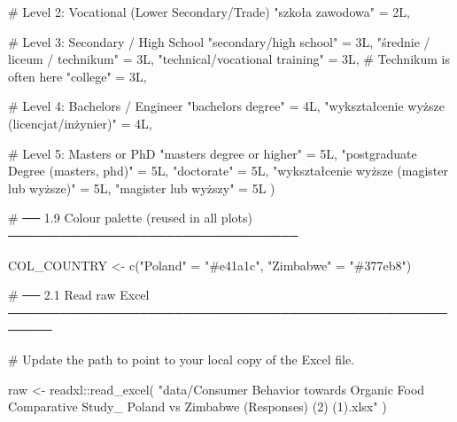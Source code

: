 \documentclass[
  letterpaper,
  DIV=11,
  numbers=noendperiod]{scrartcl}
\newenvironment{Shaded}{\begin{snugshade}}{\end{snugshade}}
\newcommand{\CommentTok}[1]{\textcolor[rgb]{0.37,0.37,0.37}{#1}}
\newcommand{\DecValTok}[1]{\textcolor[rgb]{0.68,0.00,0.00}{#1}}
\newcommand{\FunctionTok}[1]{\textcolor[rgb]{0.28,0.35,0.67}{#1}}
\newcommand{\NormalTok}[1]{\textcolor[rgb]{0.00,0.23,0.31}{#1}}
\newcommand{\OtherTok}[1]{\textcolor[rgb]{0.00,0.23,0.31}{#1}}
\newcommand{\SpecialCharTok}[1]{\textcolor[rgb]{0.37,0.37,0.37}{#1}}
\newcommand{\StringTok}[1]{\textcolor[rgb]{0.13,0.47,0.30}{#1}}
\begin{document}
\begin{Shaded}
\begin{Highlighting}[]
  \CommentTok{\# Level 2: Vocational (Lower Secondary/Trade)}
  \StringTok{"szkoła zawodowa"}                            \OtherTok{=} \DecValTok{2}\NormalTok{L, }
  
  \CommentTok{\# Level 3: Secondary / High School}
  \StringTok{"secondary/high school"}                      \OtherTok{=} \DecValTok{3}\NormalTok{L,}
  \StringTok{"średnie / liceum / technikum"}               \OtherTok{=} \DecValTok{3}\NormalTok{L,}
  \StringTok{"technical/vocational training"}              \OtherTok{=} \DecValTok{3}\NormalTok{L, }\CommentTok{\# Technikum is often here}
  \StringTok{"college"}                                    \OtherTok{=} \DecValTok{3}\NormalTok{L,}
  
  \CommentTok{\# Level 4: Bachelor\textquotesingle{}s / Engineer}
  \StringTok{"bachelor\textquotesingle{}s degree"}                          \OtherTok{=} \DecValTok{4}\NormalTok{L,}
  \StringTok{"wykształcenie wyższe (licencjat/inżynier)"}  \OtherTok{=} \DecValTok{4}\NormalTok{L,}
  
  \CommentTok{\# Level 5: Master\textquotesingle{}s or PhD}
  \StringTok{"master\textquotesingle{}s degree or higher"}                  \OtherTok{=} \DecValTok{5}\NormalTok{L,}
  \StringTok{"postgraduate Degree (masters, phd)"}         \OtherTok{=} \DecValTok{5}\NormalTok{L,}
  \StringTok{"doctorate"}                                  \OtherTok{=} \DecValTok{5}\NormalTok{L,}
  \StringTok{"wykształcenie wyższe (magister lub wyższe)"} \OtherTok{=} \DecValTok{5}\NormalTok{L,}
  \StringTok{"magister lub wyższy"}                        \OtherTok{=} \DecValTok{5}\NormalTok{L}
\NormalTok{)}
\end{Highlighting}
\end{Shaded}

\begin{Shaded}
\begin{Highlighting}[]
\CommentTok{\# ── 1.9  Colour palette (reused in all plots) ─────────────────────────────────}

\NormalTok{COL\_COUNTRY }\OtherTok{\textless{}{-}} \FunctionTok{c}\NormalTok{(}\StringTok{"Poland"} \OtherTok{=} \StringTok{"\#e41a1c"}\NormalTok{, }\StringTok{"Zimbabwe"} \OtherTok{=} \StringTok{"\#377eb8"}\NormalTok{)}

\CommentTok{\# ── 2.1  Read raw Excel ───────────────────────────────────────────────────────}

\CommentTok{\# Update the path to point to your local copy of the Excel file.}

\NormalTok{raw }\OtherTok{\textless{}{-}}\NormalTok{ readxl}\SpecialCharTok{::}\FunctionTok{read\_excel}\NormalTok{(}
  \StringTok{"data/Consumer Behavior towards Organic Food Comparative Study\_ Poland vs Zimbabwe (Responses) (2) (1).xlsx"}
\NormalTok{)}
\end{Highlighting}
\end{Shaded}
\end{document}
